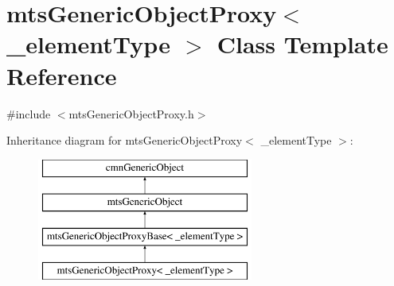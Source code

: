 \hypertarget{classmts_generic_object_proxy}{\section{mts\-Generic\-Object\-Proxy$<$ \-\_\-element\-Type $>$ Class Template Reference}
\label{classmts_generic_object_proxy}
}


{\ttfamily \#include $<$mts\-Generic\-Object\-Proxy.\-h$>$}

Inheritance diagram for mts\-Generic\-Object\-Proxy$<$ \-\_\-element\-Type $>$\-:\begin{figure}[H]
\begin{center}
\leavevmode
\includegraphics[height=4.000000cm]{d9/d3b/classmts_generic_object_proxy}
\end{center}
\end{figure}

